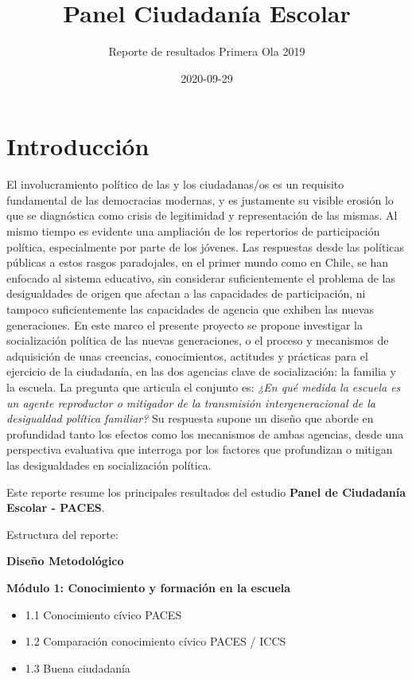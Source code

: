 \documentclass[
  14pt,
]{book}
\title{Panel Ciudadanía Escolar}
\subtitle{Reporte de resultados Primera Ola 2019}
\author{}
\date{\vspace{-2.5em}2020-09-29}
\providecommand{\tightlist}{%
  \setlength{\itemsep}{0pt}\setlength{\parskip}{0pt}}
\begin{document}
\maketitle

{
\setcounter{tocdepth}{1}
\tableofcontents
}
\hypertarget{introducciuxf3n}{%
\chapter*{Introducción}\label{introducciuxf3n}}

El involucramiento político de las y los ciudadanas/os es un requisito fundamental de las democracias modernas, y es justamente su visible erosión lo que se diagnóstica como crisis de legitimidad y representación de las mismas. Al mismo tiempo es evidente una ampliación de los repertorios de participación política, especialmente por parte de los jóvenes. Las respuestas desde las políticas públicas a estos rasgos paradojales, en el primer mundo como en Chile, se han enfocado al sistema educativo, sin considerar suficientemente el problema de las desigualdades de origen que afectan a las capacidades de participación, ni tampoco suficientemente las capacidades de agencia que exhiben las nuevas generaciones. En este marco el presente proyecto se propone investigar la socialización política de las nuevas generaciones, o el proceso y mecanismos de adquisición de unas creencias, conocimientos, actitudes y prácticas para el ejercicio de la ciudadanía, en las dos agencias clave de socialización: la familia y la escuela. La pregunta que articula el conjunto es: \emph{¿En qué medida la escuela es un agente reproductor o mitigador de la transmisión intergeneracional de la desigualdad política familiar?} Su respuesta supone un diseño que aborde en profundidad tanto los efectos como los mecanismos de ambas agencias, desde una perspectiva evaluativa que interroga por los factores que profundizan o mitigan las desigualdades en socialización política.

Este reporte resume los principales resultados del estudio \textbf{Panel de Ciudadanía Escolar - PACES}.

Estructura del reporte:

\textbf{Diseño Metodológico}

\textbf{Módulo 1: Conocimiento y formación en la escuela}

\begin{itemize}
\tightlist
\item
  1.1 Conocimiento cívico PACES
\item
  1.2 Comparación conocimiento cívico PACES / ICCS
\item
  1.3 Buena ciudadanía
\end{itemize}
\end{document}
